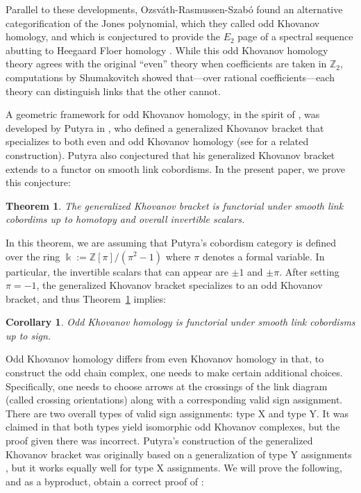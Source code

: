 \documentclass[12pt]{amsart}
\theoremstyle{definition}
\theoremstyle{plain}
\newtheorem{theorem}{Theorem}
\newtheorem{corollary}{Corollary}
\begin{document}
Parallel to these developments, Ozsv\'ath-Rasmussen-Szab\'o \cite{ORS2007} found an alternative categorification of the Jones polynomial,
which they called odd Khovanov homology, and which 
is conjectured to provide the $E_2$ page of a spectral sequence abutting to
Heegaard Floer homology  \cite{OS2004}.
While this odd Khovanov homology theory agrees with the original ``even'' theory when
coefficients are taken in $\mathbb{Z}_2$, computations by Shumakovitch \cite{Sh2011} showed that---over rational coefficients---each
theory can distinguish links that the other cannot.

A geometric framework for odd Khovanov homology, in the spirit of \cite{Bn2005},
was developed by Putyra in  \cite{Pu2015}, who defined a generalized Khovanov bracket
that specializes to both even and odd Khovanov homology
(see \cite{BW2010} for a related construction).
Putyra also conjectured that his generalized Khovanov bracket extends to a functor
on smooth link cobordisms.
In the present paper, we prove this conjecture:

\begin{theorem}\label{thm:main} The generalized Khovanov bracket is functorial under smooth
link cobordims up to homotopy and overall invertible scalars.\end{theorem}

In this theorem, we are assuming that Putyra's cobordism category
is defined over the ring
$\Bbbk:=\mathbb{Z}[\pi]/(\pi^2-1)$
where $\pi$ denotes a formal variable.
In particular, the invertible scalars that can appear
are $\pm 1$ and $\pm \pi$.
After setting $\pi=-1$, the generalized Khovanov bracket specializes to
an odd Khovanov bracket, and thus Theorem~\ref{thm:main} implies:

\begin{corollary}\label{cor:main}
Odd Khovanov homology is functorial under smooth link cobordisms up to sign.
\end{corollary}

Odd Khovanov homology differs from even Khovanov homology in that, to construct
the odd chain complex, one needs to make certain additional choices.
Specifically, one needs to choose arrows at the crossings of the link diagram (called
crossing orientations) along with a corresponding valid sign assignment.
There are two overall types of valid sign assignments: type X and type Y.
It was claimed in  \cite[Lemma 2.4]{ORS2007} that both types yield
isomorphic odd Khovanov complexes, but the proof given there was incorrect.
Putyra's construction of the generalized Khovanov bracket was originally based on a generalization of
type Y assignments  \cite{Pu2015}, but it works equally well for type X assignments.
We will prove the following, and as a byproduct, obtain a correct proof of
 \cite[Lemma 2.4]{ORS2007}:
\end{document}
